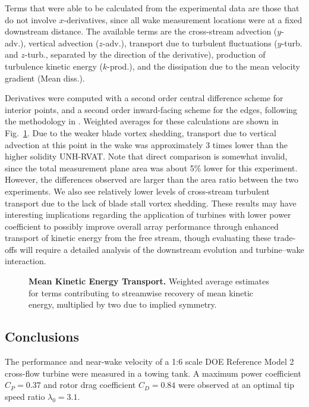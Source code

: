 \documentclass[10pt,letterpaper]{article}
\begin{document}
Terms that were able to be calculated from the experimental data are those that
do not involve $x$-derivatives, since all wake measurement locations were at a
fixed downstream distance. The available terms are the cross-stream advection
($y$-adv.), vertical advection ($z$-adv.), transport due to turbulent
fluctuations ($y$-turb. and $z$-turb., separated by the direction of the
derivative), production of turbulence kinetic energy ($k$-prod.), and the
dissipation due to the mean velocity gradient (Mean diss.).

Derivatives were computed with a second order central difference scheme for
interior points, and a second order inward-facing scheme for the edges,
following the methodology in \cite{Bachant2015-JoT}. Weighted averages for these
calculations are shown in Fig.~\ref{fig:Ktransport}. Due to the weaker blade
vortex shedding, transport due to vertical advection at this point in the wake
was approximately 3 times lower than the higher solidity UNH-RVAT. Note that
direct comparison is somewhat invalid, since the total measurement plane area
was about 5\% lower for this experiment. However, the differences observed are
larger than the area ratio between the two experiments. We also see relatively
lower levels of cross-stream turbulent transport due to the lack of blade stall
vortex shedding. These results may have interesting implications regarding the
application of turbines with lower power coefficient to possibly improve overall
array performance through enhanced transport of kinetic energy from the free
stream, though evaluating these trade-offs will require a detailed analysis of
the downstream evolution and turbine--wake interaction.

\begin{figure}

    \caption{{\bf Mean Kinetic Energy Transport.} Weighted average estimates for
    terms contributing to streamwise recovery of mean kinetic energy, multiplied
    by two due to implied symmetry.}

    \label{fig:Ktransport}
\end{figure}


\subsection*{Conclusions}

The performance and near-wake velocity of a 1:6 scale DOE Reference Model 2
cross-flow turbine were measured in a towing tank. A maximum power coefficient
$C_P = 0.37$ and rotor drag coefficient $C_D = 0.84$ were observed at an optimal
tip speed ratio $\lambda_0 = 3.1$.
\end{document}
